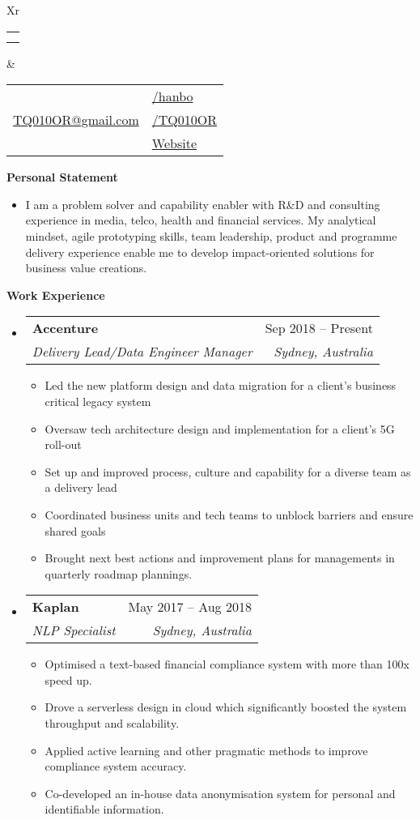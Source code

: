 \documentclass[letterpaper,12pt]{article}[leftmargin=*]
\makeatletter
\def \fullname {Bo HAN}
\def \subtitle {}
\def \linkedinicon {\faLinkedin}
\def \linkedinlink {https://linkedin.com/in/hanbo/}
\def \linkedintext {/hanbo}
\def \phoneicon {\faPhone}
\def \phonetext {+61-425-719-696}
\def \emailicon {\faEnvelope}
\def \emaillink {mailto:tq010or@gmail.com}
\def \emailtext {TQ010OR@gmail.com}
\def \githubicon {\faGithub}
\def \githublink {https://github.com/tq010or}
\def \githubtext {/TQ010OR}
\def \websiteicon {\faGlobe}
\def \websitelink {http://tq010or.github.io/}
\def \websitetext {Website}
\def \headertype {\doublecol} %
\def \entryspacing {-0pt}
\def \linkedin {\linkedinicon \hspace{3pt}\href{\linkedinlink}{\linkedintext}}
\def \phone {\phoneicon \hspace{3pt}{ \phonetext}}
\def \email {\emailicon \hspace{3pt}\href{\emaillink}{\emailtext}}
\def \github {\githubicon \hspace{3pt}\href{\githublink}{\githubtext}}
\def \website {\websiteicon \hspace{3pt}\href{\websitelink}{\websitetext}}
\renewcommand{\section}[2]{\vspace{5pt}
  \colorbox{secondary}{\color{white}\raggedbottom\normalsize\textbf{{#1}{\hspace{7pt}#2}}}
}
\newcommand{\resumeEntryStart}{\begin{itemize}[leftmargin=2.5mm]}
\newcommand{\resumeEntryEnd}{\end{itemize}\vspace{\entryspacing}}
\newcommand{\resumeItemListStart}{\begin{itemize}[leftmargin=4.5mm]}
\newcommand{\resumeItemListEnd}{\end{itemize}}
\newcommand{\resumeItem}[1]{
  \item\small{
    {#1 \vspace{-2pt}}
  }
}
\newcommand{\resumeEntryTSDL}[4]{
  \vspace{-1pt}\item[]
    \begin{tabularx}{0.97\textwidth}{X@{\hspace{60pt}}r}
      \textbf{\color{primary}#1} & {\firabook\color{accent}\small#2} \\
      \textit{\color{accent}\small#3} & \textit{\color{accent}\small#4} \\
    \end{tabularx}\vspace{-6pt}
}
\newcommand{\doublecol}[6]{
  \begin{tabularx}{\textwidth}{Xr}
    {
      \begin{tabular}[c]{l}
        \fontsize{35}{45}\selectfont{\color{primary}{{\textbf{\fullname}}}} \\
        {\textit{\subtitle}} %
      \end{tabular}
    } & {
      \begin{tabular}[c]{l@{\hspace{1.5em}}l}
        {\small#4} & {\small#1} \\
        {\small#5} & {\small#2} \\
        {\small#6} & {\small#3}
      \end{tabular}
    }
  \end{tabularx}
}
\newcommand{\singlecol}[6]{
  \begin{tabularx}{\textwidth}{Xr}
    {
      \begin{tabular}[b]{l}
        \fontsize{35}{45}\selectfont{\color{primary}{{\textbf{\fullname}}}} \\
        {\textit{\subtitle}} %
      \end{tabular}
    } & {
      \begin{tabular}[c]{l}
        {\small#1} \\
        {\small#2} \\
        {\small#3} \\
        {\small#4} \\
        {\small#5} \\
        {\small#6}
      \end{tabular}
    }
  \end{tabularx}
}
\makeatother
\begin{document}


\headertype{\linkedin}{\github}{\website}{\phone}{\email}{} %
\vspace{-10pt} %

\section{\faFlask}{Personal Statement}

    \resumeItemListStart
      \resumeItem {I am a problem solver and capability enabler with R\&D and consulting experience in media, telco, health and financial services. My analytical mindset, agile prototyping skills, team leadership, product and programme delivery experience enable me to develop impact-oriented solutions for business value creations.}
    \resumeItemListEnd

\section{\faPieChart}{Work Experience}

  \resumeEntryStart
    \resumeEntryTSDL
      {Accenture}{Sep 2018 -- Present}
      {Delivery Lead/Data Engineer Manager}{Sydney, Australia}
    \resumeItemListStart
      \resumeItem {Led the new platform design and data migration for a client's business critical legacy system}
      \resumeItem {Oversaw tech architecture design and implementation for a client's 5G roll-out}
      \resumeItem {Set up and improved process, culture and capability for a diverse team as a delivery lead}
      \resumeItem {Coordinated business units and tech teams to unblock barriers and ensure shared goals}
      \resumeItem {Brought next best actions and improvement plans for managements in quarterly roadmap plannings.}
    \resumeItemListEnd
  \resumeEntryEnd

  \resumeEntryStart
    \resumeEntryTSDL
      {Kaplan}{May 2017 -- Aug 2018}
      {NLP Specialist}{Sydney, Australia}
    \resumeItemListStart
      \resumeItem {Optimised a text-based financial compliance system with more than 100x speed up.} 
      \resumeItem{Drove a serverless design in cloud which significantly boosted the system throughput and scalability.}
      \resumeItem {Applied active learning and other pragmatic methods to improve compliance system accuracy.}
      \resumeItem {Co-developed an in-house data anonymisation system for personal and identifiable information.}
    \resumeItemListEnd
  \resumeEntryEnd
\end{document}
